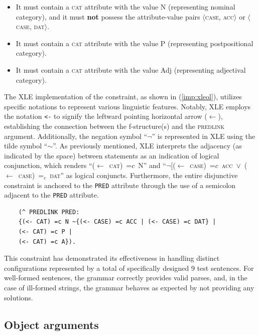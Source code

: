 \begin{itemize}
	\item It must contain a \textsc{cat} attribute with the value N (representing nominal category), and it must \textbf{not} possess the attribute-value pairs $\langle$\textsc{case, acc}$\rangle$ or $\langle$\textsc{case, dat}$\rangle$.
	\item It must contain a \textsc{cat} attribute with the value P (representing postpositional category).
	\item It must contain a \textsc{cat} attribute with the value Adj (representing adjectival category).
\end{itemize}

The XLE implementation of the constraint, as shown in (\ref{imp:xleol}), utilizes specific notations to represent various linguistic features. Notably, XLE employs the notation \texttt{<-} to signify the leftward pointing horizontal arrow ($\leftarrow$), establishing the connection between the f-structure(s) and the \textsc{predlink} argument. Additionally, the negation symbol ``$\neg$'' is represented in XLE using the tilde symbol ``$\sim$''. As previously mentioned, XLE interprets the adjacency (as indicated by the space) between statements as an indication of logical conjunction, which renders \mbox{``($\leftarrow$ \textsc{cat}) =${c}$ N''} and \mbox{``$\neg$[($\leftarrow$ \textsc{case}) =${c}$ \textsc{acc} $\lor$ ($\leftarrow$ \textsc{case}) =$_{c}$ \textsc{dat}''} as logical conjuncts. Furthermore, the entire disjunctive constraint is anchored to the \texttt{PRED} attribute through the use of a semicolon adjacent to the \texttt{PRED} attribute.
\newpage
\pex
\vspace{-20pt}
\label{imp:xleol}


\begin{lstlisting}
    (^ PREDLINK PRED: 
    {(<- CAT) =c N ~{(<- CASE) =c ACC | (<- CASE) =c DAT} | 
    (<- CAT) =c P | 
    (<- CAT) =c A}).
\end{lstlisting}
\xe


This constraint has demonstrated its effectiveness in handling distinct configurations represented by a total of specifically designed 9 test sentences. For well-formed sentences, the grammar correctly provides valid parses, and, in the case of ill-formed strings, the grammar behaves as expected by not providing any solutions.

\subsection{Object arguments}

